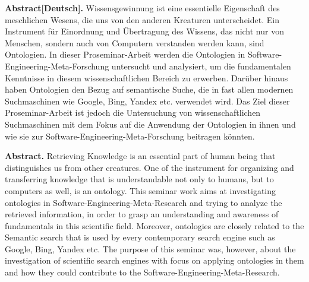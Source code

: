 \textbf{Abstract[Deutsch].} Wissensgewinnung ist eine essentielle Eigenschaft des meschlichen Wesens, die uns von den anderen Kreaturen unterscheidet. Ein Instrument für Einordnung und Übertragung des Wissens, das nicht nur von Menschen, sondern auch von Computern verstanden werden kann, sind Ontologien. In dieser Proseminar-Arbeit werden die Ontologien in Software-Engineering-Meta-Forschung untersucht und analysiert, um die fundamentalen Kenntnisse in diesem wissenschaftlichen Bereich zu erwerben. Darüber hinaus haben Ontologien den Bezug auf semantische Suche, die in fast allen modernen Suchmaschinen wie Google, Bing, Yandex etc. verwendet wird. Das Ziel dieser Proseminar-Arbeit ist jedoch die Untersuchung von wissenschaftlichen Suchmaschinen mit dem Fokus auf die Anwendung der Ontologien in ihnen und wie sie zur Software-Engineering-Meta-Forschung beitragen könnten.
\newline\newline

\textbf{Abstract.} Retrieving Knowledge is an essential part of human being that distinguishes us from other creatures. One of the instrument for organizing and transferring knowledge that is understandable not only to humans, but to computers as well, is an ontology. This seminar work aims at investigating ontologies in Software-Engineering-Meta-Research and trying to analyze the retrieved information, in order to grasp an understanding and awareness of fundamentals in this scientific field. Moreover, ontologies are closely related to the Semantic search that is used by every contemporary search engine such as Google, Bing, Yandex etc. The purpose of this seminar was, however, about the investigation of scientific search engines with focus on applying ontologies in them and how they could contribute to the Software-Engineering-Meta-Research.       